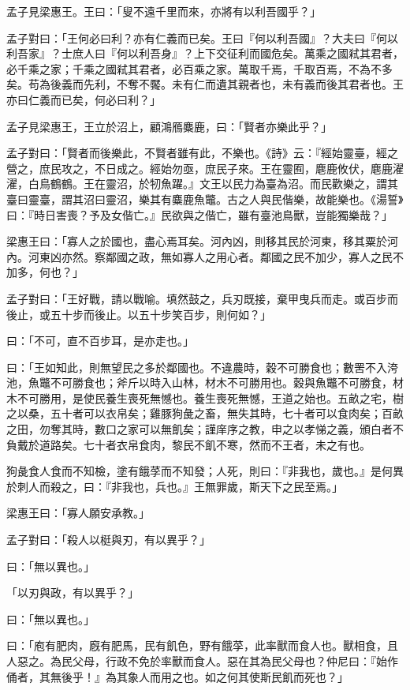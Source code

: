 
\begin{pinyinscope}
孟子見梁惠王。王曰：「叟不遠千里而來，亦將有以利吾國乎？」

孟子對曰：「王何必曰利？亦有仁義而已矣。王曰『何以利吾國』？大夫曰『何以利吾家』？士庶人曰『何以利吾身』？上下交征利而國危矣。萬乘之國弒其君者，必千乘之家；千乘之國弒其君者，必百乘之家。萬取千焉，千取百焉，不為不多矣。苟為後義而先利，不奪不饜。未有仁而遺其親者也，未有義而後其君者也。王亦曰仁義而已矣，何必曰利？」

孟子見梁惠王，王立於沼上，顧鴻鴈麋鹿，曰：「賢者亦樂此乎？」

孟子對曰：「賢者而後樂此，不賢者雖有此，不樂也。《詩》云：『經始靈臺，經之營之，庶民攻之，不日成之。經始勿亟，庶民子來。王在靈囿，麀鹿攸伏，麀鹿濯濯，白鳥鶴鶴。王在靈沼，於牣魚躍。』文王以民力為臺為沼。而民歡樂之，謂其臺曰靈臺，謂其沼曰靈沼，樂其有麋鹿魚鼈。古之人與民偕樂，故能樂也。《湯誓》曰：『時日害喪？予及女偕亡。』民欲與之偕亡，雖有臺池鳥獸，豈能獨樂哉？」

梁惠王曰：「寡人之於國也，盡心焉耳矣。河內凶，則移其民於河東，移其粟於河內。河東凶亦然。察鄰國之政，無如寡人之用心者。鄰國之民不加少，寡人之民不加多，何也？」

孟子對曰：「王好戰，請以戰喻。填然鼓之，兵刃既接，棄甲曳兵而走。或百步而後止，或五十步而後止。以五十步笑百步，則何如？」

曰：「不可，直不百步耳，是亦走也。」

曰：「王如知此，則無望民之多於鄰國也。不違農時，穀不可勝食也；數罟不入洿池，魚鼈不可勝食也；斧斤以時入山林，材木不可勝用也。穀與魚鼈不可勝食，材木不可勝用，是使民養生喪死無憾也。養生喪死無憾，王道之始也。五畝之宅，樹之以桑，五十者可以衣帛矣；雞豚狗彘之畜，無失其時，七十者可以食肉矣；百畝之田，勿奪其時，數口之家可以無飢矣；謹庠序之教，申之以孝悌之義，頒白者不負戴於道路矣。七十者衣帛食肉，黎民不飢不寒，然而不王者，未之有也。

狗彘食人食而不知檢，塗有餓莩而不知發；人死，則曰：『非我也，歲也。』是何異於刺人而殺之，曰：『非我也，兵也。』王無罪歲，斯天下之民至焉。」

梁惠王曰：「寡人願安承教。」

孟子對曰：「殺人以梃與刃，有以異乎？」

曰：「無以異也。」

「以刃與政，有以異乎？」

曰：「無以異也。」

曰：「庖有肥肉，廐有肥馬，民有飢色，野有餓莩，此率獸而食人也。獸相食，且人惡之。為民父母，行政不免於率獸而食人。惡在其為民父母也？仲尼曰：『始作俑者，其無後乎！』為其象人而用之也。如之何其使斯民飢而死也？」


\end{pinyinscope}

